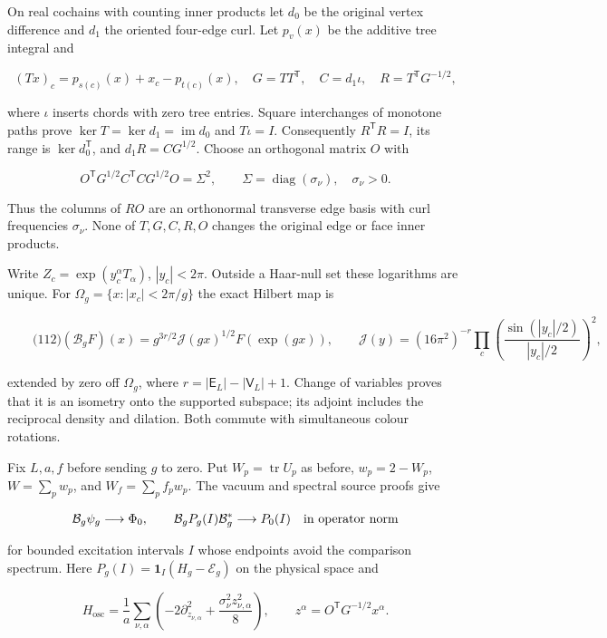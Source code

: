 On real cochains with counting inner products let \(d_0\) be the
original vertex difference and \(d_1\) the oriented four-edge curl. Let
\(p_v(x)\) be the additive tree integral and

\[
(Tx)_c=p_{s(c)}(x)+x_c-p_{t(c)}(x),\quad
 G=TT^{\mathsf T},\quad C=d_1\iota,\quad
 R=T^{\mathsf T}G^{-1/2},
\]

where \(\iota\) inserts chords with zero tree entries. Square
interchanges of monotone paths prove
\(\ker T=\ker d_1=\operatorname{im}d_0\) and \(T\iota=I\). Consequently
\(R^{\mathsf T}R=I\), its range is \(\ker d_0^{\mathsf T}\), and
\(d_1R=CG^{1/2}\). Choose an orthogonal matrix \(O\) with

\[
O^{\mathsf T}G^{1/2}C^{\mathsf T}CG^{1/2}O=\Sigma^2,\qquad
 \Sigma=\operatorname{diag}(\sigma_\nu),\quad \sigma_\nu>0.
\]

Thus the columns of \(RO\) are an orthonormal transverse edge basis with
curl frequencies \(\sigma_\nu\). None of \(T,G,C,R,O\) changes the
original edge or face inner products.

Write \(Z_c=\exp(y_c^\alpha T_\alpha)\), \(|y_c|<2\pi\). Outside a
Haar-null set these logarithms are unique. For
\(\Omega_g=\{x:|x_c|<2\pi/g\}\) the exact Hilbert map is

\[
\qquad\text{(112)}
 (\mathcal B_gF)(x)=
 g^{3r/2}\mathcal J(gx)^{1/2}F(\exp(gx)),\qquad
 \mathcal J(y)=(16\pi^2)^{-r}
 \prod_c\left(\frac{\sin(|y_c|/2)}{|y_c|/2}\right)^2,
\]

extended by zero off \(\Omega_g\), where
\(r=|\mathsf E_L|-|\mathsf V_L|+1\). Change of variables proves that it
is an isometry onto the supported subspace; its adjoint includes the
reciprocal density and dilation. Both commute with simultaneous colour
rotations.

Fix \(L,a,f\) before sending \(g\) to zero. Put
\(W_p= \operatorname{tr}U_p\) as before, \(w_p=2-W_p\), \(W=\sum_pw_p\),
and \(W_f=\sum_pf_pw_p\). The vacuum and spectral source proofs give

\[
\mathcal B_g\psi_g\longrightarrow\Phi_0,\qquad
 \mathcal B_gP_g(I)\mathcal B_g^*\longrightarrow P_0(I)
 \quad\hbox{in operator norm}
\]

for bounded excitation intervals \(I\) whose endpoints avoid the
comparison spectrum. Here \(P_g(I)=\mathbf1_I(H_g-\mathcal E_g)\) on the
physical space and

\[
H_{\mathrm{osc}}=\frac1a\sum_{\nu,\alpha}
 \left(-2\partial_{z_{\nu,\alpha}}^2+
             \frac{\sigma_\nu^2z_{\nu,\alpha}^2}{8}\right),
 \qquad z^\alpha=O^{\mathsf T}G^{-1/2}x^\alpha .
\]

